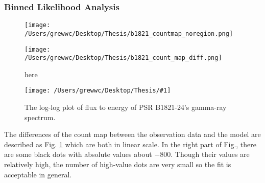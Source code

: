 \documentclass[12pt]{report}
\newcommand{\mycaption}[1]{\protect \caption{#1}}
\newcommand{\singleFig}[3]{
 \begin{figure}[!ht]
  \centering
  \texttt{[image: /Users/grewwc/Desktop/Thesis/\#1]}
  \mycaption{#3}
 \label{fig: #1}
 \end{figure}
}
\begin{document}
              \subsubsection{Binned Likelihood Analysis}
              \begin{figure}[!ht]
                \begin{center}
                \begin{minipage}{0.45\textwidth}
                  \begin{center} 
                    \texttt{[image: /Users/grewwc/Desktop/Thesis/b1821\_countmap\_noregion.png]}
                  \end{center}
                \end{minipage}
                \begin{minipage}{0.45\textwidth}
                  \begin{center}
                    \texttt{[image: /Users/grewwc/Desktop/Thesis/b1821\_count\_map\_diff.png]}
                  \end{center}
                \end{minipage}
              \end{center}
              \caption{here}
          
              \label{fig: b1821_count_map_diff.png}
            \end{figure}

            \singleFig{b1821_cur.png}{0.40}{The log-log plot of flux to energy of 
              PSR B1821-24's gamma-ray spectrum.}
              \vspace{1cm}

            The differences of the count map between the observation data and the model are described as Fig. 
            \ref{fig: b1821_count_map_diff.png} which are both in linear scale. In the right part of Fig., 
            there are some black dots 
            with absolute values about $-800$. Though their values are relatively high, the number of 
            high-value dots are very small so the fit is acceptable in general. 
\end{document}
